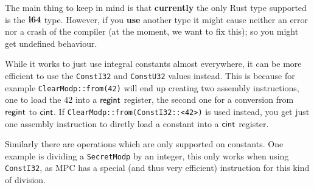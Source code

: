 The main thing to keep in mind is that {\bf currently} the only
Rust type supported is the $\mathbf{i64}$ type.
However, if you {\bf use} another type it might cause neither an error nor a crash
of the compiler (at the moment, we want to fix this); so you
might get undefined behaviour.

While it works to just use integral constants almost everywhere,
it can be more efficient to use the \verb|ConstI32| and \verb|ConstU32| values
instead. This is because for example \verb|ClearModp::from(42)| will end
up creating two assembly instructions, one to load the $42$ into a
$\mathsf{regint}$ register, the second one for a conversion from $\mathsf{regint}$ to
$\mathsf{cint}$. If \verb|ClearModp::from(ConstI32::<42>)| is used instead, you
get just one assembly instruction to diretly load a constant into a
$\mathsf{cint}$ register.

Similarly there are operations which are only supported on constants.
One example is dividing a \verb|SecretModp| by an integer, this only works
when using \verb|ConstI32|, as MPC has a special (and thus very efficient)
instruction for this kind of division.


\newpage

\newpage

\newpage

\newpage

\newpage

